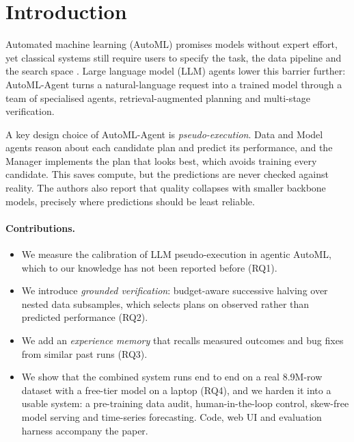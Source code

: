 \section{Introduction}
\label{sec:intro}

Automated machine learning (AutoML) promises models without expert effort, yet classical systems still require users to specify the task, the data pipeline and the search space \citep{feurer2015autosklearn,erickson2020autogluon}. Large language model (LLM) agents lower this barrier further: AutoML-Agent \citep{trirat2025automlagent} turns a natural-language request into a trained model through a team of specialised agents, retrieval-augmented planning and multi-stage verification.

A key design choice of AutoML-Agent is \emph{pseudo-execution}. Data and Model agents reason about each candidate plan and predict its performance, and the Manager implements the plan that looks best, which avoids training every candidate. This saves compute, but the predictions are never checked against reality. The authors also report that quality collapses with smaller backbone models, precisely where predictions should be least reliable.

\paragraph{Contributions.}
\begin{itemize}
  \item We measure the calibration of LLM pseudo-execution in agentic AutoML, which to our knowledge has not been reported before (RQ1).
  \item We introduce \emph{grounded verification}: budget-aware successive halving over nested data subsamples, which selects plans on observed rather than predicted performance (RQ2).
  \item We add an \emph{experience memory} that recalls measured outcomes and bug fixes from similar past runs (RQ3).
  \item We show that the combined system runs end to end on a real 8.9M-row dataset with a free-tier model on a laptop (RQ4), and we harden it into a usable system: a pre-training data audit, human-in-the-loop control, skew-free model serving and time-series forecasting. Code, web UI and evaluation harness accompany the paper.
\end{itemize}
